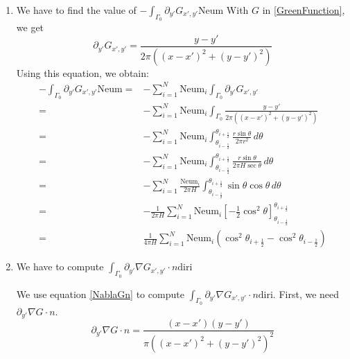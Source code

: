 \documentclass[a4paper,12pt]{article}
\newcommand{\integ}[3]{%
\ensuremath{\displaystyle{\int^{#2}_{#1} #3}}}
\begin{document}
\begin{enumerate}
 \item We have to find the value of $-\integ{\Gamma_0}{}{\partial_{y'} G_{x',y'} \text{Neum}}$
With $G$ in \ref{GreenFunction}, we get
\[
 \partial_{y'}G_{x',y'}=\frac{y-y'}{2\pi \left((x-x')^2+(y-y')^2\right)}
\]
Using this equation, we obtain:
\begin{align}
 -\integ{\Gamma_0}{}{\partial_{y'} G_{x',y'} \text{Neum}}=&-\sum\limits_{i=1}^N \text{Neum}_i \integ{\Gamma_0}{}{\partial_{y'} G_{x',y'}}\\
=&-\sum\limits_{i=1}^N \text{Neum}_i \integ{\Gamma_0}{}{\frac{y-y'}{2\pi \left((x-x')^2+(y-y')^2\right)}}\\
=&-\sum\limits_{i=1}^N \text{Neum}_i \integ{\theta_{i-\frac{1}{2}}}{\theta_{i+\frac{1}{2}}}{\frac{r \sin\theta}{2\pi r^2} \, d\theta}\\
=&-\sum\limits_{i=1}^N \text{Neum}_i \integ{\theta_{i-\frac{1}{2}}}{\theta_{i+\frac{1}{2}}}{\frac{r \sin\theta}{2\pi H \sec\theta} \, d\theta}\\
=&-\sum\limits_{i=1}^N \frac{\text{Neum}_i }{2\pi H}\integ{\theta_{i-\frac{1}{2}}}{\theta_{i+\frac{1}{2}}}{\sin\theta\cos\theta \, d\theta}\\
=&-\frac{1}{2\pi H}\sum\limits_{i=1}^N \text{Neum}_i \left[ -\frac{1}{2} \cos^2\theta \right]_{\theta_{i-\frac{1}{2}}}^{\theta_{i+\frac{1}{2}}}\\
=&\frac{1}{4\pi H}\sum\limits_{i=1}^N \text{Neum}_i \left(\cos^2\theta_{i+\frac{1}{2}}-\cos^2\theta_{i-\frac{1}{2}}\right)\label{intPartialGy}
\end{align}

\item We have to compute $\integ{\Gamma_0}{}{\partial_{y'}\nabla G_{x',y'} \cdot n \text{diri}}$

We use equation \ref{NablaGn} to compute $\integ{\Gamma_0}{}{\partial_{y'}\nabla G_{x',y'} \cdot n \text{diri}}$. First, we need $\partial_{y'}\nabla G\cdot n$.
\begin{equation}
 \partial_{y'} \nabla G\cdot n=\frac{(x-x')(y-y')}{\pi \left( (x-x')^2+(y-y')^2\right)^2}
\end{equation}


\end{enumerate}
\end{document}
